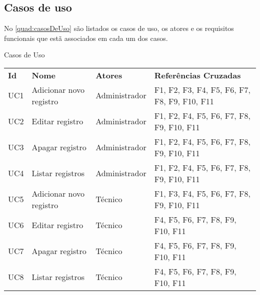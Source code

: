 \subsection{Casos de uso}\label{subsec:casosDeUso}
No \autoref{quad:casosDeUso} são listados os casos de uso, os atores e os requisitos funcionais que estã associados em cada um dos casos.

\begin{tabframed}[htb]
  \caption{Casos de Uso}
  \label{quad:casosDeUso}
  \renewcommand{\arraystretch}{1.5}
  \begin{tabular}{|l|l|l|l|}
    \cline{1-4}
    \textbf{Id}             &
    \textbf{Nome}           &
    \textbf{Atores}         &
    \textbf{Referências Cruzadas}
    \\

    \cline{1-4}
    UC1                     &
    Adicionar novo registro &
    Administrador           &
    F1, F2, F3, F4, F5, F6, F7, F8, F9, F10, F11
    \\

    \cline{1-4}
    UC2                     &
    Editar registro         &
    Administrador           &
    F1, F2, F4, F5, F6, F7, F8, F9, F10, F11
    \\

    \cline{1-4}
    UC3                     &
    Apagar registro         &
    Administrador           &
    F1, F2, F4, F5, F6, F7, F8, F9, F10, F11
    \\

    \cline{1-4}
    UC4                     &
    Listar registros        &
    Administrador           &
    F1, F2, F4, F5, F6, F7, F8, F9, F10, F11
    \\

    \cline{1-4}
    UC5                     &
    Adicionar novo registro &
    Técnico                 &
    F1, F3, F4, F5, F6, F7, F8, F9, F10, F11
    \\

    \cline{1-4}
    UC6                     &
    Editar registro         &
    Técnico                 &
    F4, F5, F6, F7, F8, F9, F10, F11
    \\

    \cline{1-4}
    UC7                     &
    Apagar registro         &
    Técnico                 &
    F4, F5, F6, F7, F8, F9, F10, F11
    \\

    \cline{1-4}
    UC8                     &
    Listar registros        &
    Técnico                 &
    F4, F5, F6, F7, F8, F9, F10, F11
    \\

    \cline{1-4}
  \end{tabular}
  \fonte{} %
\end{tabframed}

